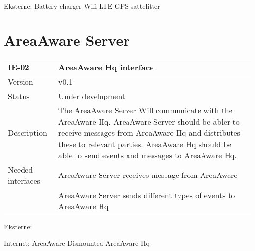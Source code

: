 Eksterne:
Battery charger
Wifi
LTE
GPS sattelitter


\section{AreaAware Server}
\begin{longtable}{| p{3.5cm} |  p{10cm} | }
	\hline
	\textbf{IE-02} &  \textbf{AreaAware Hq interface } \\
	\hline
	Version & v0.1 \\
	\hline
	Status & Under development \\
	\hline
	Description & The AreaAware Server Will communicate with the AreaAware Hq. AreaAware Server should be abler to receive messages from AreaAware Hq and distributes these to relevant parties.  AreaAware Hq should be able to send events and messages to AreaAware Hq.
	\\
	\hline
	Needed interfaces & AreaAware Server receives message from AreaAware \\
	& AreaAware Server sends different types of events to AreaAware Hq \\
	\hline
\end{longtable}


Eksterne:

Internet: 
AreaAware Dismounted
AreaAware Hq
